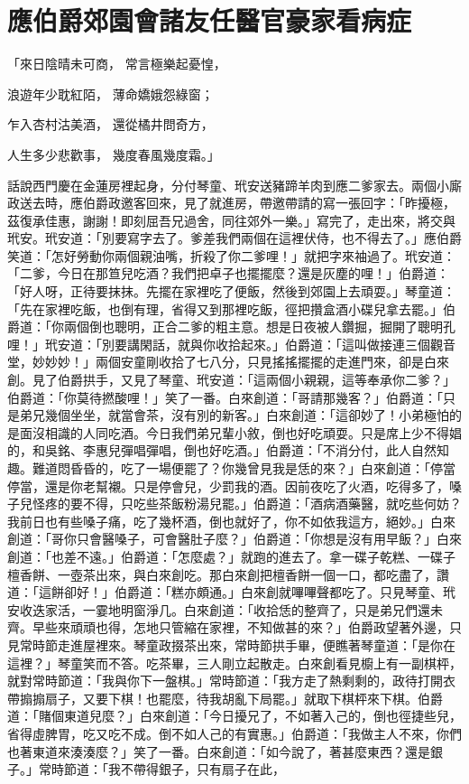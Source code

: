%

\chapter{應伯爵郊園會諸友\KG 任醫官豪家看病症}

「來日陰晴未可商，  常言極樂起憂惶，

浪遊年少耽紅陌，  薄命嬌娥怨綠窗；

乍入杏村沽美酒，  還從橘井問奇方，

人生多少悲歡事，  幾度春風幾度霜。」

話說西門慶在金蓮房裡起身，分付琴童、玳安送豬蹄羊肉到應二爹家去。兩個小廝政送去時，應伯爵政邀客回來，見了就進房，帶邀帶請的寫一張回字：「昨擾極，茲復承佳惠，謝謝！即刻屈吾兄過舍，同往郊外一樂。」寫完了，走出來，將交與玳安。玳安道：「別要寫字去了。爹差我們兩個在這裡伏侍，也不得去了。」應伯爵笑道：「怎好勞動你兩個親油嘴，折殺了你二爹哩！」就把字來袖過了。玳安道：「二爹，今日在那笪兒吃酒？我們把卓子也擺擺麼？還是灰塵的哩！」伯爵道：「好人呀，正待要抹抹。先擺在家裡吃了便飯，然後到郊園上去頑耍。」琴童道：「先在家裡吃飯，也倒有理，省得又到那裡吃飯，徑把攢盒酒小碟兒拿去罷。」伯爵道：「你兩個倒也聰明，正合二爹的粗主意。想是日夜被人鑽掘，掘開了聰明孔哩！」玳安道：「別要講閑話，就與你收拾起來。」伯爵道：「這叫做接連三個觀音堂，妙妙妙！」兩個安童剛收拾了七八分，只見搖搖擺擺的走進門來，卻是白來創。見了伯爵拱手，又見了琴童、玳安道：「這兩個小親親，這等奉承你二爹？」伯爵道：「你莫待撚酸哩！」笑了一番。白來創道：「哥請那幾客？」伯爵道：「只是弟兄幾個坐坐，就當會茶，沒有別的新客。」白來創道：「這卻妙了！小弟極怕的是面沒相識的人同吃酒。今日我們弟兄輩小敘，倒也好吃頑耍。只是席上少不得娼的，和吳銘、李惠兒彈唱彈唱，倒也好吃酒。」伯爵道：「不消分付，此人自然知趣。難道悶昏昏的，吃了一場便罷了？你幾曾見我是恁的來？」白來創道：「停當停當，還是你老幫襯。只是停會兒，少罰我的酒。因前夜吃了火酒，吃得多了，嗓子兒怪疼的要不得，只吃些茶飯粉湯兒罷。」伯爵道：「酒病酒藥醫，就吃些何妨？我前日也有些嗓子痛，吃了幾杯酒，倒也就好了，你不如依我這方，絕妙。」白來創道：「哥你只會醫嗓子，可會醫肚子麼？」伯爵道：「你想是沒有用早飯？」白來創道：「也差不遠。」伯爵道：「怎麼處？」就跑的進去了。拿一碟子乾糕、一碟子檀香餅、一壺茶出來，與白來創吃。那白來創把檀香餅一個一口，都吃盡了，讚道：「這餅卻好！」伯爵道：「糕亦頗通。」白來創就嗶嗶聲都吃了。只見琴童、玳安收迭家活，一霎地明窗淨几。白來創道：「收拾恁的整齊了，只是弟兄們還未齊。早些來頑頑也得，怎地只管縮在家裡，不知做甚的來？」伯爵政望著外邊，只見常時節走進屋裡來。琴童政掇茶出來，常時節拱手畢，便瞧著琴童道：「是你在這裡？」琴童笑而不答。吃茶畢，三人剛立起散走。白來創看見櫥上有一副棋枰，就對常時節道：「我與你下一盤棋。」常時節道：「我方走了熱剩剩的，政待打開衣帶搧搧扇子，又要下棋！也罷麼，待我胡亂下局罷。」就取下棋枰來下棋。伯爵道：「賭個東道兒麼？」白來創道：「今日擾兄了，不如著入己的，倒也徑捷些兒，省得虛脾胃，吃又吃不成。倒不如人己的有實惠。」伯爵道：「我做主人不來，你們也著東道來湊湊麼？」笑了一番。白來創道：「如今說了，著甚麼東西？還是銀子。」常時節道：「我不帶得銀子，只有扇子在此，